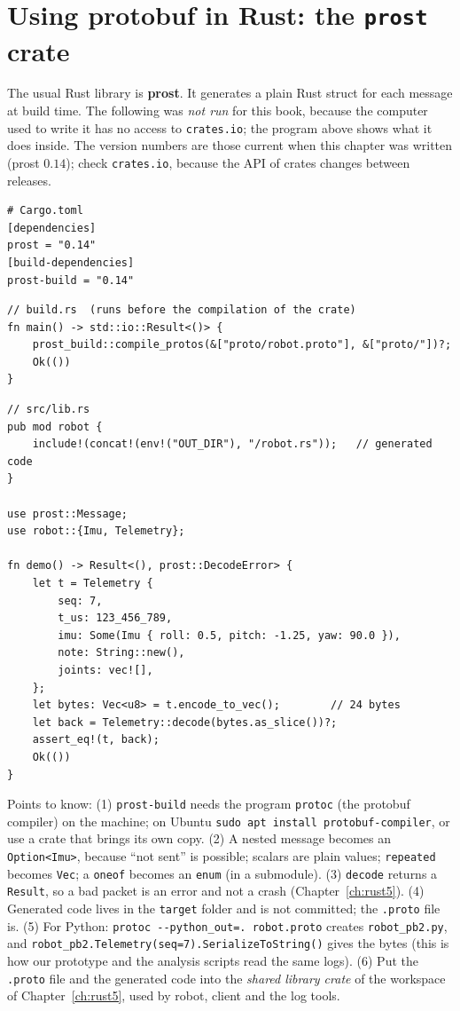 \section*{Using protobuf in Rust: the \texttt{prost} crate}
The usual Rust library is \textbf{prost}. It generates a plain Rust struct for each message at build time. The following was \emph{not run} for this book, because the computer used to write it has no access to \verb!crates.io!; the program above shows what it does inside. The version numbers are those current when this chapter was written (prost $0.14$); check \verb!crates.io!, because the API of crates changes between releases.
\begin{verbatim}
# Cargo.toml
[dependencies]
prost = "0.14"
[build-dependencies]
prost-build = "0.14"
\end{verbatim}
\begin{verbatim}
// build.rs  (runs before the compilation of the crate)
fn main() -> std::io::Result<()> {
    prost_build::compile_protos(&["proto/robot.proto"], &["proto/"])?;
    Ok(())
}
\end{verbatim}
\begin{verbatim}
// src/lib.rs
pub mod robot {
    include!(concat!(env!("OUT_DIR"), "/robot.rs"));   // generated code
}

use prost::Message;
use robot::{Imu, Telemetry};

fn demo() -> Result<(), prost::DecodeError> {
    let t = Telemetry {
        seq: 7,
        t_us: 123_456_789,
        imu: Some(Imu { roll: 0.5, pitch: -1.25, yaw: 90.0 }),
        note: String::new(),
        joints: vec![],
    };
    let bytes: Vec<u8> = t.encode_to_vec();        // 24 bytes
    let back = Telemetry::decode(bytes.as_slice())?;
    assert_eq!(t, back);
    Ok(())
}
\end{verbatim}
Points to know: (1) \verb!prost-build! needs the program \verb!protoc! (the protobuf compiler) on the machine; on Ubuntu \verb!sudo apt install protobuf-compiler!, or use a crate that brings its own copy. (2) A nested message becomes an \verb!Option<Imu>!, because ``not sent'' is possible; scalars are plain values; \verb!repeated! becomes \verb!Vec!; a \verb!oneof! becomes an \verb!enum! (in a submodule). (3) \verb!decode! returns a \verb!Result!, so a bad packet is an error and not a crash (Chapter~\ref{ch:rust5}). (4) Generated code lives in the \verb!target! folder and is not committed; the \verb!.proto! file is. (5) For Python: \verb!protoc --python_out=. robot.proto! creates \verb!robot_pb2.py!, and \verb!robot_pb2.Telemetry(seq=7).SerializeToString()! gives the bytes (this is how our prototype and the analysis scripts read the same logs). (6) Put the \verb!.proto! file and the generated code into the \emph{shared library crate} of the workspace of Chapter~\ref{ch:rust5}, used by robot, client and the log tools.

